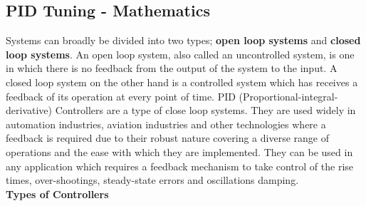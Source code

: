 \subsection{PID Tuning - Mathematics}
Systems can broadly be divided into two types; \textbf{open loop systems} and \textbf{closed loop systems}. An open loop system, also called an uncontrolled system, is one in which there is no feedback from the output of the system to the input. A closed loop system on the other hand is a controlled system which has receives a feedback of its operation at every point of time. PID (Proportional-integral-derivative) Controllers are a type of close loop systems. They are used widely in automation industries, aviation industries and other technologies where a feedback is required due to their robust nature covering a diverse range of operations and the ease with which they are implemented. They can be used in any application which requires a feedback mechanism to take control of the rise times, over-shootings, steady-state errors and oscillations damping.
\\
\textbf{Types of Controllers}
